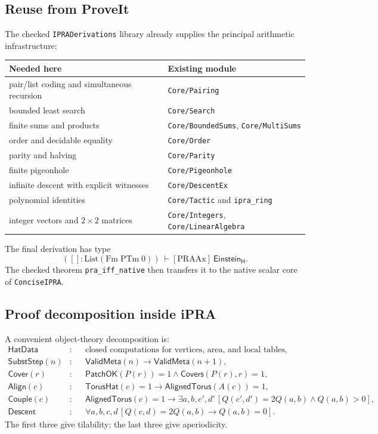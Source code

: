 \documentclass[11pt]{article}
\newcommand{\Htile}{\mathsf H}
\begin{document}
\subsection{Reuse from ProveIt}
The checked \texttt{IPRADerivations} library already supplies the principal arithmetic
infrastructure:
\begin{center}
\begin{tabular}{ll}
\toprule
Needed here & Existing module\\
\midrule
pair/list coding and simultaneous recursion & \texttt{Core/Pairing}\\
bounded least search & \texttt{Core/Search}\\
finite sums and products & \texttt{Core/BoundedSums}, \texttt{Core/MultiSums}\\
order and decidable equality & \texttt{Core/Order}\\
parity and halving & \texttt{Core/Parity}\\
finite pigeonhole & \texttt{Core/Pigeonhole}\\
infinite descent with explicit witnesses & \texttt{Core/DescentEx}\\
polynomial identities & \texttt{Core/Tactic} and \texttt{ipra\_ring}\\
integer vectors and $2\times2$ matrices & \texttt{Core/Integers}, \texttt{Core/LinearAlgebra}\\
\bottomrule
\end{tabular}
\end{center}
The final derivation has type
\[
 ([]:\mathrm{List}(\mathrm{Fm}\;\mathrm{PTm}\;0))\ \vdash[\mathrm{PRAAx}]\
    \mathsf{Einstein}_{\Htile}.
\]
The checked theorem \texttt{pra\_iff\_native} then transfers it to the native scalar core
of \texttt{ConciseIPRA}.

\subsection{Proof decomposition inside iPRA}
A convenient object-theory decomposition is:
\begin{align*}
\mathsf{HatData}&: &&\text{closed computations for vertices, area, and local tables},\\
\mathsf{SubstStep}(n)&: &&\mathsf{ValidMeta}(n)\to\mathsf{ValidMeta}(n+1),\\
\mathsf{Cover}(r)&: &&\mathsf{PatchOK}(P(r))=1\wedge\mathsf{Covers}(P(r),r)=1,\\
\mathsf{Align}(c)&: &&\mathsf{TorusHat}(c)=1\to\mathsf{AlignedTorus}(A(c))=1,\\
\mathsf{Couple}(c)&: &&\mathsf{AlignedTorus}(c)=1\to
   \exists a,b,c',d'\,[Q(c',d')=2Q(a,b)\wedge Q(a,b)>0],\\
\mathsf{Descent}&: &&\forall a,b,c,d\,[Q(c,d)=2Q(a,b)\to Q(a,b)=0].
\end{align*}
The first three give tilability; the last three give aperiodicity.
\end{document}
